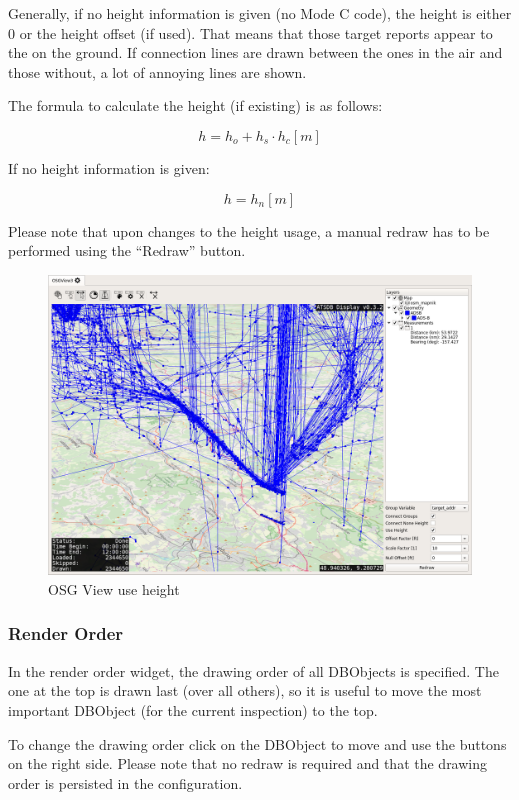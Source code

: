 {Generally, if no height information is given (no Mode C code), the height is either $0$ or the height offset (if used). That means that those target reports appear to the on the ground. If connection lines are drawn between the ones in the air and those without, a lot of annoying lines are shown.

The formula to calculate the height (if existing) is as follows:

$$ h = h_o + h_s \cdot h_c [m]$$ 

If no height information is given:

$$ h = h_n [m]$$ 

Please note that upon changes to the height usage, a manual redraw has to be performed using the ``Redraw'' button.


\begin{figure}[H]
    \hspace*{-2cm}
    \includegraphics[width=18cm,frame]{../screenshots/osgview_use_height.png}
  \caption{OSG View use height}
\end{figure}

\subsubsection{Render Order}

In the render order widget, the drawing order of all DBObjects is specified. The one at the top is drawn last (over all others), so it is useful to move the most important DBObject (for the current inspection) to the top.

To change the drawing order click on the DBObject to move and use the buttons on the right side. Please note that no redraw is required and that the drawing order is persisted in the configuration.

}

